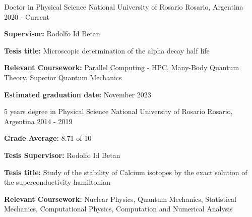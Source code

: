 

\begin{cventries}

  \cventry
    {Doctor in Physical Science} %
    {National University of Rosario} %
    {Rosario, Argentina} %
    {2020 - Current} %
    {
      \begin{cvitems} %
        \item {\textbf{Supervisor:} Rodolfo Id Betan}
        \item {\textbf{Tesis title:} Microscopic determination of the alpha decay half life}
        \item {\textbf{Relevant Coursework:} Parallel Computing - HPC, Many-Body Quantum Theory, Superior Quantum Mechanics }
        \item {\textbf{Estimated graduation date:} November 2023}
      \end{cvitems}
    }
  \cventry
    {5 years degree in Physical Science} %
    {National University of Rosario} %
    {Rosario, Argentina} %
    {2014 - 2019} %
    {
      \begin{cvitems} %
        \item {\textbf{Grade Average:} 8.71 of 10}
        \item {\textbf{Tesis Supervisor:} Rodolfo Id Betan}
        \item {\textbf{Tesis title:} Study of the stability of Calcium isotopes by the exact solution of the superconductivity hamiltonian}
        \item {\textbf{Relevant Coursework:} Nuclear Physics, Quantum Mechanics,  Statistical Mechanics, Computational Physics, Computation and Numerical Analysis}
      \end{cvitems}
    }
\end{cventries}

